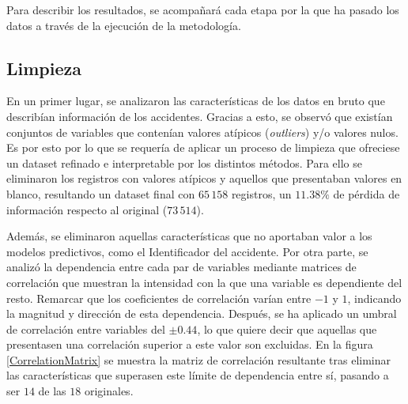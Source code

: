 Para describir los resultados, se acompañará cada etapa por la que ha pasado los datos a través de la ejecución de la metodología.

\subsection*{Limpieza}



En un primer lugar, se analizaron las características de los datos en bruto que describían información de los accidentes. Gracias a esto, se observó que existían conjuntos de variables que contenían valores atípicos (\textit{outliers}) y/o valores nulos. Es por esto por lo que se requería de aplicar un proceso de limpieza que ofreciese un dataset refinado e interpretable por los distintos métodos. Para ello se eliminaron los registros con valores atípicos y aquellos que presentaban valores en blanco, resultando un dataset final con $65\,158$ registros, un $11.38\%$ de pérdida de información respecto al original ($73\,514$).


Además, se eliminaron aquellas características que no aportaban valor a los modelos predictivos, como el Identificador del accidente. Por otra parte, se analizó la dependencia entre cada par de variables mediante matrices de correlación que muestran la intensidad con la que una variable es dependiente del resto. Remarcar que los coeficientes de correlación varían entre $-1$ y $1$, indicando la magnitud y dirección de esta dependencia. Después, se ha aplicado un umbral de correlación entre variables del $\pm 0.44$, lo que quiere decir que aquellas que presentasen una correlación superior a este valor son excluidas. En la figura \ref{CorrelationMatrix} se muestra la matriz de correlación resultante tras eliminar las características que superasen este límite de dependencia entre sí, pasando a ser $14$ de las $18$ originales.

